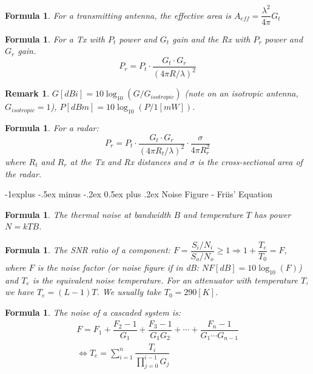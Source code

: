 \documentclass[11pt,landscape]{article}
\makeatletter
\newtheorem{formula}[definition]{Formula}
\newtheorem{remark}[definition]{Remark}
\renewcommand{\subsection}{\@startsection{subsection}{2}{0mm}%
                                {-1explus -.5ex minus -.2ex}%
                                {0.5ex plus .2ex}%
                                {\normalfont\normalsize\bfseries}}
\makeatother
\begin{document}
\begin{multicols}{3}
\begin{formula}
    For a transmitting antenna, the effective area is $A_{eff}=\dfrac{\lambda^2}{4\pi} G_t$
\end{formula}

\begin{formula}
    For a Tx with $P_t$ power and $G_t$ gain and the Rx with $P_r$ power and $G_r$ gain.
    $$P_r=P_t\cdot\dfrac{G_t\cdot G_r}{(4\pi R/\lambda)^2}$$
\end{formula}

\begin{remark}
    $G[dBi]=10\log_{10}(G/G_{isotropic})$ (note on an isotropic antenna, $G_{isotropic}=1$), $P[dBm]=10\log_{10}(P/1[mW])$.
\end{remark}

\begin{formula}
    For a radar: $$P_r=P_t\cdot \dfrac{G_t\cdot G_r}{(4\pi R_t/\lambda)^2}\cdot\dfrac{\sigma}{4\pi R_r^2}$$ where $R_t$ and $R_r$ at the Tx and Rx distances and $\sigma$ is the cross-sectional area of the radar.
\end{formula}

\subsection{Noise Figure - Friis' Equation}

\begin{formula}
    The thermal noise at bandwidth $B$ and temperature $T$ has power $N=kTB$.
\end{formula}

\begin{formula}
    The SNR ratio of a component: $F=\dfrac{S_i/N_i}{S_o/N_o}\geq 1\Rightarrow 1+\dfrac{T_e}{T_0}=F$, where $F$ is the noise factor (or noise figure if in dB: $NF[dB]=10\log_{10}(F)$) and $T_e$ is the equivalent noise temperature.
    For an attenuator with temperature $T$, we have $T_e=(L-1)T$. We usually take $T_0=290[K]$.
\end{formula}

\begin{formula}
    The noise of a cascaded system is:
    \begin{align*}
        F=F_1+\dfrac{F_2-1}{G_1}+\dfrac{F_3-1}{G_1 G_2}+\cdots +\dfrac{F_n-1}{G_1\cdots G_{n-1}}
        \\
        \Leftrightarrow T_e=\sum_{i=1}^n\dfrac{T_i}{\prod_{j=0}^{i-1}G_j}
    \end{align*}
\end{formula}


\end{multicols}
\end{document}
